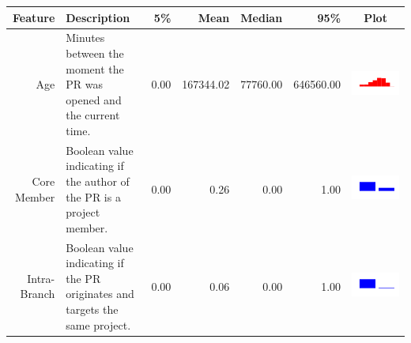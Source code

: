\begin{table}[ht]
  \centering
  \begin{tabular}{rp{20em}rrrrc}
    \hline
    \textbf{Feature} & \textbf{Description} & \textbf{5\%} & \textbf{Mean} & \textbf{Median} & \textbf{95\%} & \textbf{Plot} \\
    \hline
    Age & Minutes between the moment the PR was opened and the current time. & 0.00 & 167344.02 & 77760.00 & 646560.00 & \includegraphics[scale = 0.1, clip = true, trim= 50px 60px 50px 60px]{../figs/hist-features/hist-age.pdf} \\
    Core Member & Boolean value indicating if the author of the PR is a project member. & 0.00 & 0.26 & 0.00 & 1.00 & \includegraphics[scale = 0.1, clip = true, trim= 50px 60px 50px 60px]{../figs/hist-features/hist-coreMember.pdf} \\
    Intra-Branch & Boolean value indicating if the PR originates and targets the same project. & 0.00 & 0.06 & 0.00 & 1.00 & \includegraphics[scale = 0.1, clip = true, trim= 50px 60px 50px 60px]{../figs/hist-features/hist-intraBranch.pdf} \\

\end{tabular}
\end{table}
